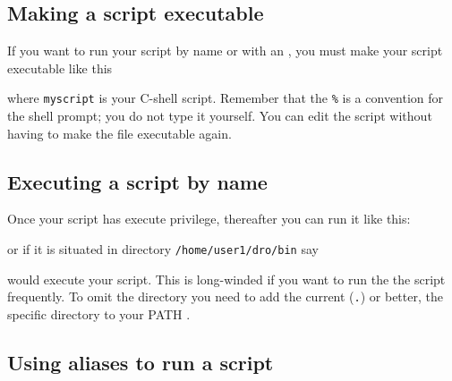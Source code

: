 \documentclass[twoside,11pt,nolof]{starlink}
\providecommand{\latexelsehtml}[2]{#1}
\begin{document}
\subsection{Making a script executable
\label{sc4_se_executable}}

If you want to run your script by name or with an , you must make your
script executable like this

\begin{small}
\begin{terminalv}
\end{terminalv}
\end{small}
where \texttt{myscript} is your C-shell script. \latexelsehtml{Remember}{Note}
that the \texttt{\%} is a convention for the shell prompt; you do not type
it yourself.  You can edit the script without having to make the file
executable again.

\subsection{Executing a script by name
\label{sc4_se_by_name}}

Once your script has execute privilege, thereafter you can
run it like this:

\begin{small}
\begin{terminalv}
\end{terminalv}
\end{small}
or if it is situated in directory \texttt{/home/user1/dro/bin} say

\begin{small}
\begin{terminalv}
\end{terminalv}
\end{small}
would execute your script.  This is long-winded if you want to run the
the script frequently.  To omit the directory  you need to add the current ({\texttt{.}}) or better,
the specific directory to your PATH
.


\subsection{Using aliases to run a script
\label{sc4_se_aliases}}
\end{document}
